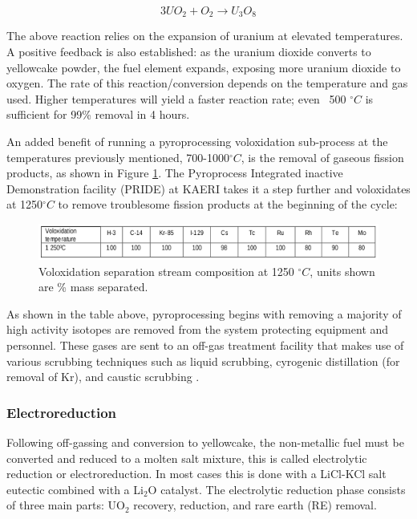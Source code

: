 \[ 3UO_2 + O_2 \rightarrow U_3O_8 \]

The above reaction relies on the expansion of uranium at elevated temperatures. A positive feedback is also established: as the uranium dioxide converts to yellowcake powder, the fuel element expands, exposing more uranium dioxide to oxygen. The rate of this reaction/conversion depends on the temperature and gas used. Higher temperatures will yield a faster reaction rate; even ~500 $^\circ C$ is sufficient for 99\% removal in 4 hours.

An added benefit of running a pyroprocessing voloxidation sub-process at the temperatures previously mentioned, 700-1000$^\circ C$, is the removal of gaseous fission products, as shown in Figure \ref{fig:volox}. The
Pyroprocess Integrated inactive Demonstration facility (PRIDE) at KAERI takes it a step further and voloxidates at 1250$^\circ C$ to remove troublesome fission products at the beginning of the cycle\cite{organisation}:

\begin{figure}[h]
	\includegraphics[width=\linewidth]{images/volox_table.png}
	\caption{Voloxidation separation stream composition at 1250 $^\circ C$, units shown are \% mass separated.}
	\label{fig:volox}
\end{figure}

As shown in the table above, pyroprocessing begins with removing a majority of high activity isotopes are removed from the system protecting equipment and personnel. These gases are sent to an off-gas treatment facility that makes use of various scrubbing techniques such as liquid scrubbing, cyrogenic distillation (for removal of Kr), and caustic scrubbing \cite{jubin_spent_2009}.

\subsubsection{Electroreduction}
Following off-gassing and conversion to yellowcake, the non-metallic fuel must be converted and reduced to a molten salt mixture, this is called electrolytic reduction or electroreduction.
In most cases this is done with a LiCl-KCl salt eutectic combined with a Li$_2$O catalyst. The electrolytic reduction phase consists of three main parts: UO$_2$ recovery, reduction, and rare earth (RE) removal.

